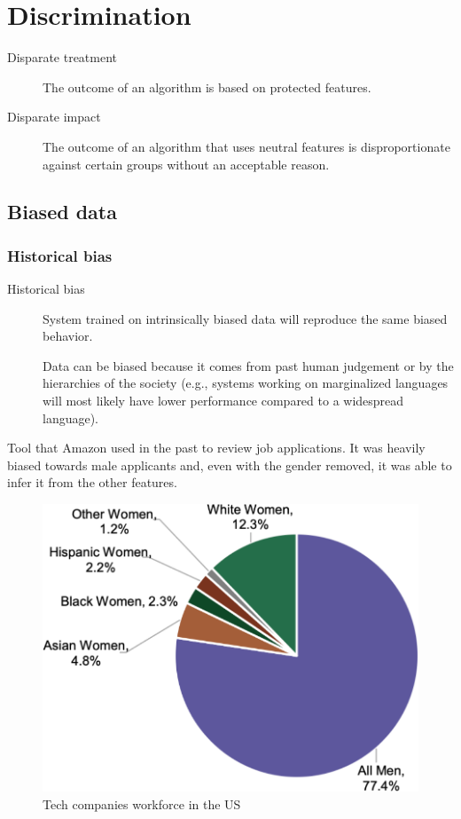 \chapter{Discrimination}

\begin{description}
    \item[Disparate treatment] 
        The outcome of an algorithm is based on protected features.

    \item[Disparate impact] 
        The outcome of an algorithm that uses neutral features is disproportionate against certain groups without an acceptable reason.
\end{description}


\section{Biased data}


\subsection{Historical bias}

\begin{description}
    \item[Historical bias] 
        System trained on intrinsically biased data will reproduce the same biased behavior.

        \begin{remark}
            Data can be biased because it comes from past human judgement or by the hierarchies of the society (e.g., systems working on marginalized languages will most likely have lower performance compared to a widespread language).
        \end{remark}
\end{description}

\begin{example}
    Tool that Amazon used in the past to review job applications. It was heavily biased towards male applicants and, even with the gender removed, it was able to infer it from the other features.

    \begin{figure}[H]
        \centering
        \includegraphics[width=0.3\linewidth]{./img/tech_workforce.png}
        \caption{Tech companies workforce in the US}
    \end{figure}
\end{example}

